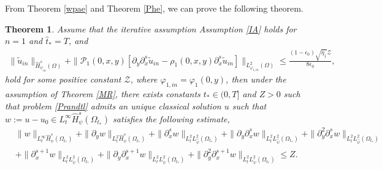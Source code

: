 \documentclass{amsart}
\numberwithin{equation}{section}
\newtheorem{theorem}{Theorem}[section]
\begin{document}
From Theorem \ref{wpae} and Theorem \ref{Phe}, we can prove the following theorem.
\begin{theorem}\label{MRp}
Assume that the iterative assumption Assumption \ref{IA} holds for $n=1$ and $\hat{t}_{*}=T$, and
\begin{align}\label{ITA11}
 \|\tilde{u}_{in}\|_{\hat{H}_{\psi_{in}}^{s}(\Omega)}
+\|\mathcal{P}_{1}(0,x,y)[\partial_{y}\partial_{x}^{s}\tilde{u}_{in}-\rho_{1}(0,x,y)\partial_{x}^{s}\tilde{u}_{in}]\|_{L_{\varphi_{1,in}}^{2}(\Omega)}
\leq \frac{(1-\epsilon_{0})\sqrt{\bar{\eta}_{1}}\mathcal{Z}}{8\epsilon_{0}},
\end{align}
hold for some positive constant $\mathcal{Z}$, where $\varphi_{1,in}=\varphi_{1}(0,y)$, then under the assumption of Theorem \ref{MR}, there exists constants $t_{*}\in(0,T]$ and $Z>0$ such that problem \eqref{Prandtl} admits an unique classical solution $u$ such that $w:=u-u_{0}\in L_{t}^{\infty}\hat{H}_{\psi}^{s}(\Omega_{t_{*}})$ satisfies the following estimate,
\begin{align}\label{ME}
& \|w\|_{L_{t}^{\infty}\hat{H}_{\psi}^{s}(\Omega_{t_{*}})}
 +\|\partial_{y}w\|_{L_{t}^{2}\hat{H}_{\psi}^{s}(\Omega_{t_{*}})}
 +\|\partial_{x}^{s}w\|_{L_{t}^{2}L_{\hat{\psi}}^{2}(\Omega_{t_{*}})}
 +\|\partial_{y}\partial_{x}^{s}w\|_{L_{t}^{2}L_{\hat{\psi}}^{2}(\Omega_{t_{*}})}
 +\|\partial_{y}^{2}\partial_{x}^{s}w\|_{L_{t}^{2}L_{\hat{\psi}}^{2}(\Omega_{t_{*}})}\\
&+\|\partial_{x}^{s+1}w\|_{L_{t}^{2}L_{\check{\psi}}^{2}(\Omega_{t_{*}})}
 +\|\partial_{y}\partial_{x}^{s+1}w\|_{L_{t}^{2}L_{\check{\psi}}^{2}(\Omega_{t_{*}})}
 +\|\partial_{y}^{2}\partial_{x}^{s+1}w\|_{L_{t}^{2}L_{\check{\psi}}^{2}(\Omega_{t_{*}})}
\leq Z.\nonumber
\end{align}
\end{theorem}
\end{document}
